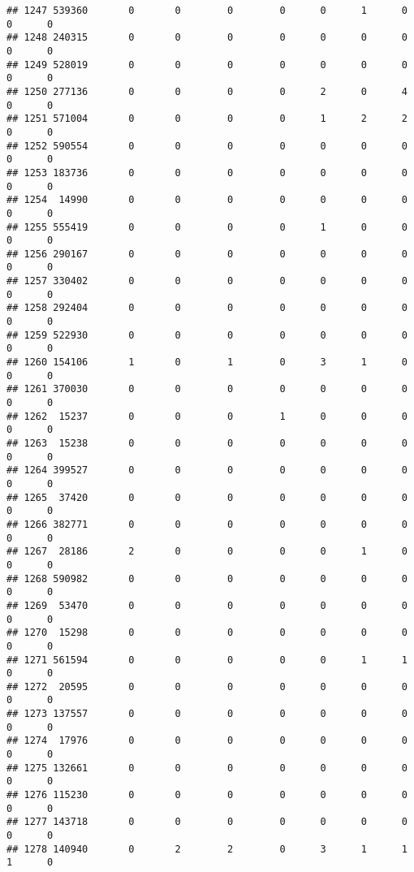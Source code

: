 \documentclass[
]{article}
\begin{document}
\begin{verbatim}
## 1247 539360       0       0        0        0      0      1      0     0      0
## 1248 240315       0       0        0        0      0      0      0     0      0
## 1249 528019       0       0        0        0      0      0      0     0      0
## 1250 277136       0       0        0        0      2      0      4     0      0
## 1251 571004       0       0        0        0      1      2      2     0      0
## 1252 590554       0       0        0        0      0      0      0     0      0
## 1253 183736       0       0        0        0      0      0      0     0      0
## 1254  14990       0       0        0        0      0      0      0     0      0
## 1255 555419       0       0        0        0      1      0      0     0      0
## 1256 290167       0       0        0        0      0      0      0     0      0
## 1257 330402       0       0        0        0      0      0      0     0      0
## 1258 292404       0       0        0        0      0      0      0     0      0
## 1259 522930       0       0        0        0      0      0      0     0      0
## 1260 154106       1       0        1        0      3      1      0     0      0
## 1261 370030       0       0        0        0      0      0      0     0      0
## 1262  15237       0       0        0        1      0      0      0     0      0
## 1263  15238       0       0        0        0      0      0      0     0      0
## 1264 399527       0       0        0        0      0      0      0     0      0
## 1265  37420       0       0        0        0      0      0      0     0      0
## 1266 382771       0       0        0        0      0      0      0     0      0
## 1267  28186       2       0        0        0      0      1      0     0      0
## 1268 590982       0       0        0        0      0      0      0     0      0
## 1269  53470       0       0        0        0      0      0      0     0      0
## 1270  15298       0       0        0        0      0      0      0     0      0
## 1271 561594       0       0        0        0      0      1      1     0      0
## 1272  20595       0       0        0        0      0      0      0     0      0
## 1273 137557       0       0        0        0      0      0      0     0      0
## 1274  17976       0       0        0        0      0      0      0     0      0
## 1275 132661       0       0        0        0      0      0      0     0      0
## 1276 115230       0       0        0        0      0      0      0     0      0
## 1277 143718       0       0        0        0      0      0      0     0      0
## 1278 140940       0       2        2        0      3      1      1     1      0

\end{verbatim}
\end{document}
